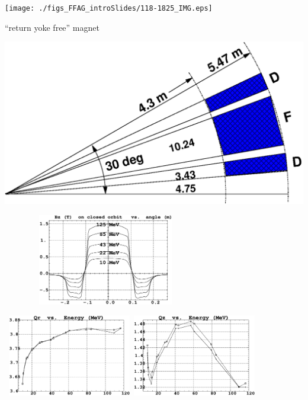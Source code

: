 \documentclass[12pt]{article}
\begin{document}
\begin{minipage}[b]{.36\linewidth}
\hspace{-10mm} \texttt{[image: ./figs\_FFAG\_introSlides/118-1825\_IMG.eps]}

``return yoke free'' magnet %

\includegraphics*[width=7.cm]{./figs_FFAG_introSlides/FigTriplet.eps}

\hspace{-0mm}\includegraphics[bbllx=20,bblly=120,bburx=567,bbury=480,width=9.00cm,height=4cm]{./figs_FFAG_introSlides/fieldOnCO.eps}

\mbox{ \hspace{-10mm}
\includegraphics[bbllx=20,bblly=120,bburx=567,bbury=500,width=5.400cm]{./figs_FFAG_introSlides/QrVsE.eps}
\hspace{-2mm}\includegraphics[bbllx=20,bblly=120,bburx=567,bbury=500,width=5.400cm]{./figs_FFAG_introSlides/QzVsE.eps}
}

~~~~~~~~~~~~~

\end{minipage}\hspace{0mm}
\end{document}
